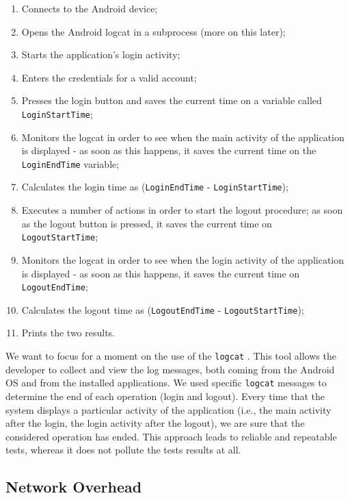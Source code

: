 \documentclass[english]{llncs}
\begin{document}
\begin{enumerate}
	\item Connects to the Android device;
	\item Opens the Android logcat in a subprocess (more on this later);
	\item Starts the application's login activity;
	\item Enters the credentials for a valid account;
	\item Presses the login button and saves the current time on a variable called \verb+LoginStartTime+;
	\item Monitors the logcat in order to see when the main activity of the application is displayed - as soon as this happens, it saves the current time on the \verb+LoginEndTime+ variable;
	\item Calculates the login time as (\verb+LoginEndTime+ - \verb+LoginStartTime+);
	\item Executes a number of actions in order to start the logout procedure; as soon as the logout button is pressed, it saves the current time on \verb+LogoutStartTime+;
	\item Monitors the logcat in order to see when the login activity of the application is displayed - as soon as this happens, it saves the current time on \verb+LogoutEndTime+;
	\item Calculates the logout time as (\verb+LogoutEndTime+ - \verb+LogoutStartTime+);
	\item Prints the two results.
\end{enumerate}

We want to focus for a moment on the use of the \verb+logcat+ \cite{logcat_doc}. This tool allows the developer to collect and view the log messages, both coming from the Android OS and from the installed applications. We used specific \verb+logcat+ messages to determine the end of each operation (login and logout). Every time that the system displays a particular activity of the application (i.e., the main activity after the login, the login activity after the logout), we are sure that the considered operation has ended. This approach leads to reliable and repeatable tests, whereas it does not pollute the tests results at all.

\subsection{Network Overhead}
\label{Network Overhead}
\end{document}
